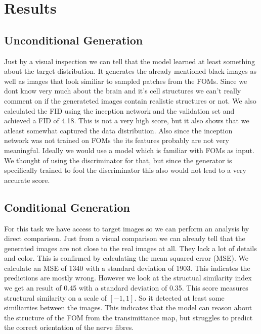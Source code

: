 \documentclass[12pt]{article}
\begin{document}
\section{Results}
\subsection{Unconditional Generation}
Just by a visual inspection we can tell that the model learned at least something about the target distribution. It generates the already mentioned black images as well as images that look similiar to sampled patches from the FOMs. Since we dont know very much about the brain and it's cell structures we can't really comment on if the generateted images contain realistic structures or not. We also calculated the FID using the inception network and the validation set and achieved a FID of 4.18. This is not a very high score, but it also shows that we atleast somewhat captured the data distribution. Also since the inception network was not trained on FOMs the its features probably are not very meaningful. Ideally we would use a model which is familiar with FOMs as input. We thought of using the discriminator for that, but since the generator is specifically trained to fool the discriminator this also would not lead to a very accurate score.
\subsection{Conditional Generation}
For this task we have access to target images so we can perform an analysis by direct comparison. Just from a visual comparison we can already tell that the generated images are not close to the real images at all. They lack a lot of details and color. This is confirmed by calculating the mean squared error (MSE). We calculate an MSE of 1340 with a standard deviation of 1903. This indicates the predictions are mostly wrong. However we look at the structual similarity index we get an result of 0.45 with a standard deviation of 0.35. This score measures structural similarity on a scale of $[-1, 1]$. So it detected at least some similiarties between the images. This indicates that the model can reason about the structure of the FOM from the transimittance map, but struggles to predict the correct orientation of the nerve fibres. 
%
\end{document}
